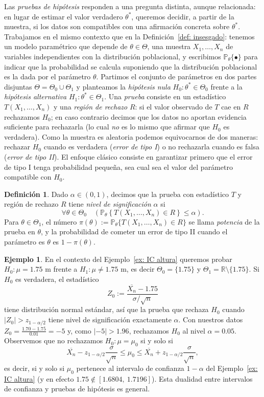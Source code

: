 \documentclass[12pt]{amsart}
\theoremstyle{definition}
\newtheorem{definition}[lemma]{Definición}
\newtheorem{examplex}[lemma]{Ejemplo}
\renewcommand{\leq}{\leqslant}
\newcommand{\PP}{\ensuremath{\mathbb{P}}}
\newcommand{\RR}{\ensuremath{\mathbb{R}}}
\begin{document}
Las \emph{pruebas de hipótesis} responden a una pregunta distinta, aunque relacionada: en lugar de estimar el valor verdadero $\theta^*$, queremos decidir, a partir de la muestra, si los datos son compatibles con una afirmación concreta sobre $\theta^*$. Trabajamos en el mismo contexto que en la Definición~\ref{def: insesgado}: tenemos un modelo paramétrico que depende de $\theta\in\Theta$, una muestra $X_1,\dots,X_n$ de variables independientes con la distribución poblacional, y escribimos $\PP_\theta\{\bullet\}$ para indicar que la probabilidad se calcula suponiendo que la distribución poblacional es la dada por el parámetro $\theta$. Partimos el conjunto de parámetros en dos partes disjuntas $\Theta=\Theta_0\cup\Theta_1$ y planteamos la \emph{hipótesis nula} $H_0:\theta^*\in\Theta_0$ frente a la \emph{hipótesis alternativa} $H_1:\theta^*\in\Theta_1$. Una \emph{prueba} consiste en un estadístico $T(X_1,\dots,X_n)$ y una \emph{región de rechazo} $R$: si el valor observado de $T$ cae en $R$ rechazamos $H_0$; en caso contrario decimos que los datos no aportan evidencia suficiente para rechazarla (lo cual \emph{no} es lo mismo que afirmar que $H_0$ es verdadera). Como la muestra es aleatoria podemos equivocarnos de dos maneras: rechazar $H_0$ cuando es verdadera (\emph{error de tipo I}) o no rechazarla cuando es falsa (\emph{error de tipo II}). El enfoque clásico consiste en garantizar primero que el error de tipo I tenga probabilidad pequeña, sea cual sea el valor del parámetro compatible con $H_0$.

\begin{definition} Dado $\alpha\in(0,1)$, decimos que la prueba con estadístico $T$ y región de rechazo $R$ tiene \emph{nivel de significación} $\alpha$ si
    \[\forall \theta\in\Theta_0\quad \left(\PP_\theta\left\{T(X_1,\dots,X_n)\in R\right\}\leq \alpha\right).\]
Para $\theta\in\Theta_1$, el número $\pi(\theta):=\PP_\theta\{T(X_1,\dots,X_n)\in R\}$ se llama \emph{potencia} de la prueba en $\theta$, y la probabilidad de cometer un error de tipo II cuando el parámetro es $\theta$ es $1-\pi(\theta)$.
\end{definition}

\begin{examplex} En el contexto del Ejemplo~\ref{ex: IC altura} queremos probar $H_0:\mu=1.75$ m frente a $H_1:\mu\neq 1.75$ m, es decir $\Theta_0=\{1.75\}$ y $\Theta_1=\RR\setminus\{1.75\}$. Si $H_0$ es verdadera, el estadístico
\[Z_0:=\frac{\overline{X_n}-1.75}{\sigma/\sqrt{n}}\]
tiene distribución normal estándar, así que la prueba que rechaza $H_0$ cuando $|Z_0|>z_{1-\alpha/2}$ tiene nivel de significación exactamente $\alpha$. Con nuestros datos $Z_0=\frac{1.70-1.75}{0.01}=-5$ y, como $|-5|>1.96$, rechazamos $H_0$ al nivel $\alpha=0.05$. Observemos que no rechazamos $H_0:\mu=\mu_0$ si y solo si
\[\overline{X_n}-z_{1-\alpha/2}\frac{\sigma}{\sqrt{n}}\leq \mu_0\leq \overline{X_n}+z_{1-\alpha/2}\frac{\sigma}{\sqrt{n}},\]
es decir, si y solo si $\mu_0$ pertenece al intervalo de confianza $1-\alpha$ del Ejemplo~\ref{ex: IC altura} (y en efecto $1.75\notin[1.6804,\ 1.7196]$). Esta dualidad entre intervalos de confianza y pruebas de hipótesis es general.
\end{examplex}
\end{document}
